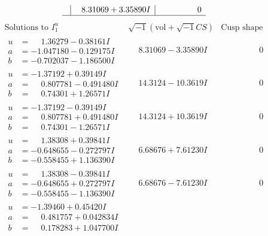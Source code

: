 \documentclass[1p]{elsarticle_modified}
\theoremstyle{definition}
\newcommand{\I}{\sqrt{-1}}
\begin{document}
$$\begin{array}{c|c|c}
 & \phantom{-}8.31069 + 3.35890 I & \phantom{-0.000000 } 0\\
 \hline 
 \end{array}$$\newpage$$\begin{array}{c|c|c}  
\text{Solutions to }I^u_{1}& \I (\text{vol} + \sqrt{-1}CS) & \text{Cusp shape}\\
 \hline 
\begin{aligned}
u &= \phantom{-}1.36279 - 0.38161 I \\
a &= -1.047180 - 0.129175 I \\
b &= -0.702037 - 1.186500 I\end{aligned}
 & \phantom{-}8.31069 - 3.35890 I & \phantom{-0.000000 } 0 \\ \hline\begin{aligned}
u &= -1.37192 + 0.39149 I \\
a &= \phantom{-}0.807781 - 0.491480 I \\
b &= \phantom{-}0.74301 + 1.26571 I\end{aligned}
 & \phantom{-}14.3124 - 10.3619 I & \phantom{-0.000000 } 0 \\ \hline\begin{aligned}
u &= -1.37192 - 0.39149 I \\
a &= \phantom{-}0.807781 + 0.491480 I \\
b &= \phantom{-}0.74301 - 1.26571 I\end{aligned}
 & \phantom{-}14.3124 + 10.3619 I & \phantom{-0.000000 } 0 \\ \hline\begin{aligned}
u &= \phantom{-}1.38308 + 0.39841 I \\
a &= -0.648655 - 0.272797 I \\
b &= -0.558455 + 1.136390 I\end{aligned}
 & \phantom{-}6.68676 + 7.61230 I & \phantom{-0.000000 } 0 \\ \hline\begin{aligned}
u &= \phantom{-}1.38308 - 0.39841 I \\
a &= -0.648655 + 0.272797 I \\
b &= -0.558455 - 1.136390 I\end{aligned}
 & \phantom{-}6.68676 - 7.61230 I & \phantom{-0.000000 } 0 \\ \hline\begin{aligned}
u &= -1.39460 + 0.45420 I \\
a &= \phantom{-}0.481757 + 0.042834 I \\
b &= \phantom{-}0.178283 + 1.047700 I\end{aligned}

\end{array}$$
\end{document}
